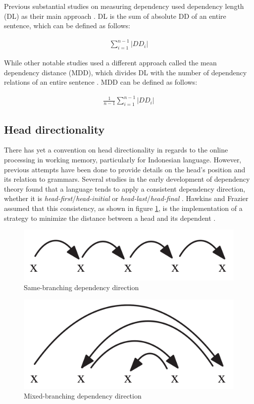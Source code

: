 \documentclass[10pt, a4paper, conference, compsocconf]{IEEEtran}
\begin{document}
Previous substantial studies on measuring dependency used dependency length (DL) as their main approach \cite{gildea2010grammars, futrell2015large}. DL is the sum of absolute DD of an entire sentence, which can be defined as follows:

\begin{align}\label{eq:bola}
	\displaystyle\sum_{i=1}^{n-1} |DD_i|
\end{align}

\noindent While other notable studies used a different approach called the mean dependency distance (MDD), which divides DL with the number of dependency relations of an entire sentence \cite{liu2008dependency, liu2017dependency}. MDD can be defined as follows:

\begin{align}\label{eq:bola}
	\frac{1}{n-1} \displaystyle\sum_{i=1}^{n-1} |DD_i|
\end{align}

\subsection{Head directionality}

There has yet a convention on head directionality in regards to the online processing in working memory, particularly for Indonesian language. However, previous attempts have been done to provide details on the head's position and its relation to grammars. Several studies in the early development of dependency theory found that a language tends to apply a consistent dependency direction, whether it is \textit{head-first}/\textit{head-initial} or \textit{head-last}/\textit{head-final} \cite{hawkins1994performance, radford1997syntactic, vennemann1994linguistic}. Hawkins and Frazier assumed that this consistency, as shown in figure \ref{fig:samebranching}, is the implementation of a strategy to minimize the distance between a head and its dependent \cite{hawkins1994performance, frazier1985syntactic}.  

\begin{figure}
	\centering \includegraphics[width=0.3
	\textwidth] {pics/samebranching.png} \caption{Same-branching dependency direction \cite{temperley2008dependency}} 
\label{fig:samebranching} \end{figure}

\begin{figure}
	\centering \includegraphics[width=0.3
	\textwidth] {pics/mixedbranching.png} \caption{Mixed-branching dependency direction \cite{temperley2008dependency}} 
\label{fig:mixedbranching} \end{figure}
\end{document}

